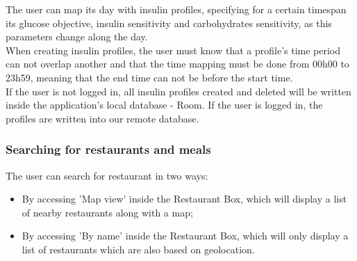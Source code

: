 The user can map its day with insulin profiles, specifying for a certain timespan its glucose objective, insulin sensitivity and carbohydrates sensitivity, as this parameters
change along the day.\\

When creating insulin profiles, the user must know that a profile's time period can not overlap another and that the time mapping must be done from 00h00 to 23h59, meaning that
the end time can not be before the start time.\\

If the user is not logged in, all insulin profiles created and deleted will be written inside the application's local database - Room. If the user is logged in,
the profiles are written into our remote database.\\

\subsubsection{Searching for restaurants and meals}

The user can search for restaurant in two ways:
\begin{itemize}
    \item By accessing 'Map view' inside the Restaurant Box, which will display a list of nearby restaurants along with a map;
    \item By accessing 'By name' inside the Restaurant Box, which will only display a list of restaurants which are also based
    on geolocation.
\end{itemize}


